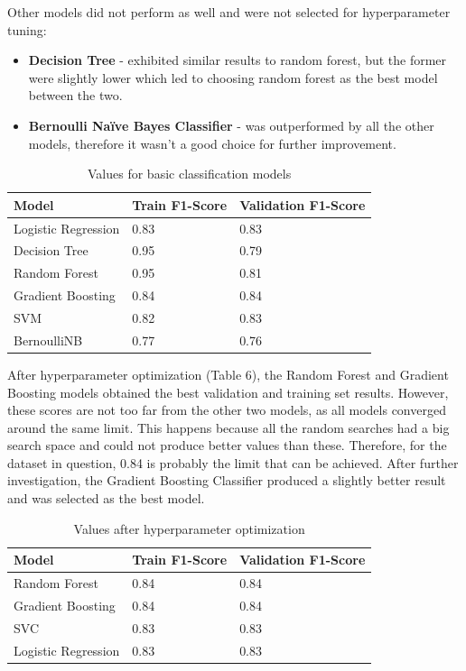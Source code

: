 \documentclass[a4paper,oneside,bibliography=totoc]{scrbook}
\begin{document}
Other models did not perform as well and were not selected for hyperparameter tuning:
\begin{itemize}
	\item \textbf{Decision Tree} - exhibited similar results to random forest, but the former were slightly lower which led to choosing random forest as the best model between the two. 
	\item \textbf{Bernoulli Naïve Bayes Classifier} - was outperformed by all the other models, therefore it wasn’t a good choice for further improvement.
\end{itemize} 

\begin{table}[H]
	\centering
	\fontsize{10}{12}\selectfont
	\begin{tabular}{|l|l|l|}
		\hline \textbf{Model} & \textbf{Train F1-Score} & \textbf{Validation F1-Score} \\
		\hline Logistic Regression & 0.83 & 0.83 \\
		\hline Decision Tree & 0.95 & 0.79 \\
		\hline Random Forest & 0.95 & 0.81 \\
		\hline Gradient Boosting & 0.84 & 0.84 \\
		\hline SVM & 0.82 & 0.83 \\
		\hline BernoulliNB & 0.77 & 0.76 \\
		\hline
	\end{tabular}
	\caption{Values for basic classification models}
	\label{tab:t5}
\end{table}


After hyperparameter optimization (Table 6), the Random Forest and Gradient Boosting models obtained the best validation and training set results. However, these scores are not too far from the other two models, as all models converged around the same limit. This happens because all the random searches had a big search space and could not produce better values than these. Therefore, for the dataset in question, 0.84 is probably the limit that can be achieved. After further investigation, the Gradient Boosting Classifier produced a slightly better result and was selected as the best model.

\begin{table}[ht]
	\centering
	\fontsize{10}{12}\selectfont
	\begin{tabular}{|l|l|l|}
		\hline \textbf{Model} & \textbf{Train F1-Score} & \textbf{Validation F1-Score} \\
		\hline Random Forest & 0.84 & 0.84 \\
		\hline Gradient Boosting & 0.84 & 0.84 \\
		\hline SVC & 0.83 & 0.83 \\
		\hline Logistic Regression & 0.83 & 0.83 \\
		\hline 
	\end{tabular}
	\caption{Values after hyperparameter optimization}
	\label{tab:t6}
\end{table}
\end{document}
